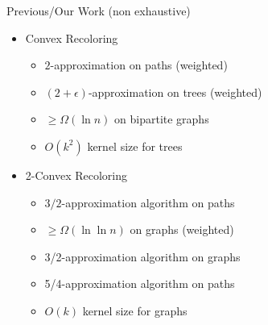 \begin{frame}{Previous/\alert{Our} Work (non exhaustive)}
\begin{itemize}
\item
Convex Recoloring
\begin{itemize}

\pause\item
$2$-approximation on paths (weighted)

\pause\item
$(2 + \epsilon)$-approximation on trees (weighted)

\pause\item
$\geq \Omega(\ln{n})$ on bipartite graphs

\pause\item
$O(k^2)$ kernel size for trees


\end{itemize}
\pause\item
2-Convex Recoloring
\begin{itemize}


\pause\item
$3/2$-approximation algorithm on paths

\pause\item
$\geq \Omega(\ln\ln{n})$ on graphs (weighted)

\pause\item
\alert{3/2-approximation algorithm on graphs}

\pause\item
\alert{5/4-approximation algorithm on paths}

\pause\item
\alert{$O(k)$ kernel size for graphs}


\end{itemize}
\end{itemize}
\end{frame}